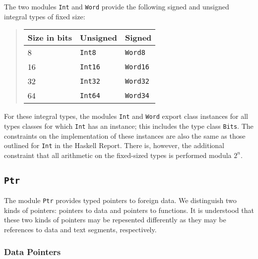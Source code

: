 \documentclass[a4paper,twosides]{article}
\newcommand{\code}[1]{\texttt{#1}}      %
\begin{document}
The two modules \code{Int} and \code{Word} provide the following signed and
unsigned integral types of fixed size:
%
\begin{quote}
  \begin{tabular}{|l|l|l|}
    \hline
    Size in bits & Unsigned     & Signed\\\hline\hline
    8            & \code{Int8}  & \code{Word8}\\
    16           & \code{Int16} & \code{Word16}\\
    32           & \code{Int32} & \code{Word32}\\
    64           & \code{Int64} & \code{Word34}\\
    \hline
  \end{tabular}
\end{quote}
%
For these integral types, the modules \code{Int} and \code{Word} export class
instances for all types classes for which \code{Int} has an instance; this
includes the type class \code{Bits}.  The constraints on the implementation of
these instances are also the same as those outlined for \code{Int} in the
Haskell Report.  There is, however, the additional constraint that all
arithmetic on the fixed-sized types is performed modula \(2^n\).

\subsection{\code{Ptr}}
\label{sec:Ptr}

The module \code{Ptr} provides typed pointers to foreign data.  We distinguish
two kinds of pointers: pointers to data and pointers to functions.  It is
understood that these two kinds of pointers may be repesented differently as
they may be references to data and text segments, respectively.

\subsubsection{Data Pointers}
\end{document}
